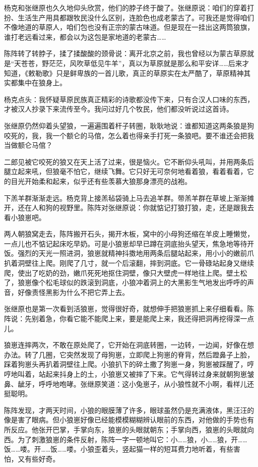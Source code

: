 \par 杨克和张继原也久久地仰头欣赏，他们的脖子终于酸了。张继原说：咱们的穿着打扮、生活生产用具都跟牧民没什么区别，连脸色也成老蒙古了。可我还是觉得咱们不像地道的草原人，咱们包也没有正宗的蒙古味道。但是现在一挂出这两筒狼旗，谁打老远看过来，都会以为这包是家地道的老蒙古……
\par 陈阵转了转脖子，揉了揉酸酸的颈骨说：离开北京之前，我也曾经以为蒙古草原就是“天苍苍，野茫茫，风吹草低见牛羊”，真以为草原就是那么和平安详……后来才知道，《敕勒歌》只是鲜卑族的一首儿歌，真正的草原实在太严酷了，草原精神其实都集中在狼身上。
\par 杨克点头：我怀疑草原民族真正精彩的诗歌都没传下来，只有合汉人口味的东西，才被汉人抄录下来流传至今。我问过好几个牧民，他们都没听说过这首诗。
\par 张继原仍然仰着头望狼，一遍遍围着杆子转圈，耿耿地说：谁都知道这两条狼是狗咬死的，我，我一个额仑的马倌，怎么着也得亲手打死一条狼吧。要不谁还会把我当做额仑马倌？
\par 二郎见被它咬死的狼又在天上活了过来，很是恼火。它不断仰头吼叫，并用两条后腿立起来吼，但狼毫不怕它，继续飞舞。它只好无可奈何地看着狼，看着看着，它的目光开始柔和起来，似乎还有些羡慕大狼那身漂亮的战袍。
\par 下羔羊群渐渐走远。杨克背上接羔毡袋骑上马去追羊群。带羔羊群在草坡上渐渐摊开，还在人和狗的视野里。陈阵对张继原说：你就惦记打狼打狼，走，还是跟我去看小狼崽吧。
\par 两人朝狼窝走去，陈阵搬开石头，揭开木板，窝中的小母狗还缩在羊皮上睡懒觉，一点儿也不惦记起床吃早奶。可是小狼崽却早已蹲在洞底抬头望天，焦急地等待开饭。强烈的天光一照进洞，狼崽就精神抖擞地用两条后腿站起来，用小小的嫩前爪扒着洞壁往上爬。刚爬了几寸，就一个后滚翻，摔到洞底。它一骨碌站起身又继续爬，使出了吃奶的劲，嫩爪死死地抠住洞壁，像只大壁虎一样地往上爬。壁土松了，狼崽像个松毛球似的跌滚到洞底，小狼冲着洞上的大黑影生气地发出呼呼的声音，好像责怪黑影为什么不把它弄上去。
\par 张继原也是第一次看到活狼崽，觉得很好奇，就想伸手把狼崽抓上来仔细看看。陈阵说：先别着急，你看它能不能爬上来，要是能爬上来，我还得把洞再挖得深一点儿。
\par 狼崽连摔两次，不敢在原处爬了，它开始在洞底转圈，一边转，一边闻，好像在想办法。转了几圈，它突然发现了母狗崽，立即爬上狗崽的脊背，然后蹬鼻子上脸，踩着狗崽头再扒着洞壁往上爬。小狼扒下的碎土撒了狗崽一身，狗崽被踩醒了，哼哼地叫着，站起来抖身上的土，小狼崽又被摔了下来。它气得转过身来就朝狗崽皱鼻、龇牙，呼呼地咆哮。张继原笑道：这小兔崽子，从小狼性就不小啊，看样儿还挺聪明。
\par 陈阵发现，才两天时间，小狼的眼膜薄了许多，眼球虽然仍是充满液体，黑汪汪的像是害了眼病。但小狼崽好像已经能模模糊糊辨认眼前的东西，对他做的手势也有所反应。他张开巴掌，手掌向东，狼崽的头眼就朝东；手掌向西，狼崽的头眼就向西。为了刺激狼崽的条件反射，陈阵一字一顿地叫它：小……狼，小……狼，开……饭……喽。开……饭……喽。小狼歪着头，竖起猫一样的短耳费力地听着，有些害怕，又有些好奇。
